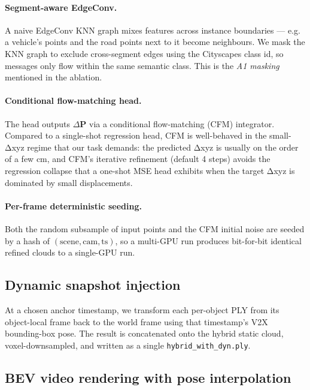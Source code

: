 \documentclass[10pt,twocolumn,letterpaper]{article}
\begin{document}
\paragraph{Segment-aware EdgeConv.} A naive EdgeConv KNN graph mixes
features across instance boundaries — e.g. a vehicle's points and the
road points next to it become neighbours. We mask the KNN graph to
exclude cross-segment edges using the Cityscapes class id, so messages
only flow within the same semantic class. This is the \emph{A1
masking} mentioned in the ablation.

\paragraph{Conditional flow-matching head.} The head outputs
$\Delta\mathbf{P}$ via a conditional flow-matching (CFM)
\cite{conditionalflowmatching,rectifiedflow} integrator. Compared to
a single-shot regression head, CFM is well-behaved in the small-Δxyz
regime that our task demands: the predicted Δxyz is usually on the
order of a few cm, and CFM's iterative refinement (default 4 steps)
avoids the regression collapse that a one-shot MSE head exhibits when
the target Δxyz is dominated by small displacements.

\paragraph{Per-frame deterministic seeding.} Both the random
subsample of input points and the CFM initial noise are seeded by a
hash of $(\text{scene}, \text{cam}, \text{ts})$, so a multi-GPU run
produces bit-for-bit identical refined clouds to a single-GPU run.


\subsection{Dynamic snapshot injection}
\label{sec:method-inject}

At a chosen anchor timestamp, we transform each per-object PLY from its
object-local frame back to the world frame using that timestamp's V2X
bounding-box pose. The result is concatenated onto the hybrid static
cloud, voxel-downsampled, and written as a single \texttt{hybrid\_with\_dyn.ply}.


\subsection{BEV video rendering with pose interpolation}
\label{sec:method-bev}
\end{document}
